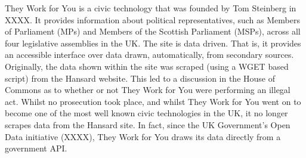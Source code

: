 They Work for You is a civic technology that was founded by Tom Steinberg in XXXX.
It provides information about political representatives, such as Members of Parliament (MPs) and Members of the Scottish Parliament (MSPs), across all four legislative assemblies in the UK.
The site is data driven.
That is, it provides an accessible interface over data drawn, automatically, from secondary sources.
Originally, the data shown within the site was scraped (using a WGET based script) from the Hansard website.
This led to a discussion in the House of Commons as to whether or not They Work for You were performing an illegal act.
Whilst no prosecution took place, and whilst They Work for You went on to become one of the most well known civic technologies in the UK,
it no longer scrapes data from the Hansard site.
In fact, since the UK Government's Open Data initiative (XXXX), They Work for You draws its data directly from a government API.